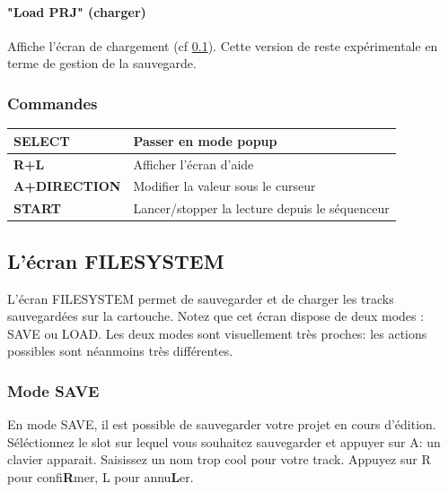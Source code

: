 \documentclass[12pt,a4paper]{article}
\begin{document}
        \paragraph{"Load PRJ" (charger)} Affiche l'écran de chargement (cf \ref{filesystem}). Cette version de \FAT reste expérimentale en terme de gestion de la sauvegarde.

        \subsubsection{Commandes}
        \tablelasttail{\hline}
        \begin{supertabular}{|l|p{11cm}|}
        \hline
            {\bf SELECT} & Passer en mode popup \\
            \hline
            {\bf R+L} & Afficher l'écran d'aide \\
            \hline
            {\bf A+DIRECTION} & Modifier la valeur sous le curseur \\
            \hline
            {\bf START} & Lancer/stopper la lecture depuis le séquenceur \\
        \hline
        \end{supertabular}

    \subsection{L'écran FILESYSTEM}\label{filesystem}

    L'écran FILESYSTEM permet de sauvegarder et de charger les tracks sauvegardées sur la cartouche. Notez que cet écran dispose de deux modes : SAVE ou LOAD. Les deux modes sont visuellement très proches: les actions possibles sont néanmoins très différentes.

        \subsubsection{Mode SAVE}

        En mode SAVE, il est possible de sauvegarder votre projet en cours d'édition. Séléctionnez le slot sur lequel vous souhaitez sauvegarder et appuyer sur A: un clavier apparait. Saisissez un nom trop cool pour votre track. Appuyez sur R pour confi{\bf R}mer, L pour annu{\bf L}er.
\end{document}

